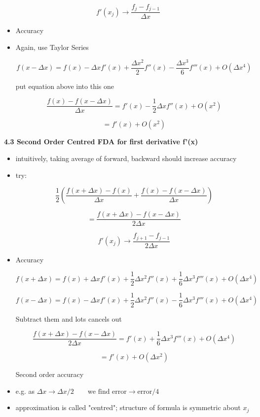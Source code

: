 \begin{equation}
    f'(x_j) \rightarrow \frac{f_j-f_{j-1}}{\Delta x}
\end{equation}

\begin{itemize}
    \item Accuracy
    \item Again, use Taylor Series

    \[ f(x-\Delta x) = f(x) - \Delta x f'(x) + \frac{\Delta x^2}{2} f''(x) - \frac{\Delta x^3}{6} f'''(x) + O(\Delta x^4)\]

    put equation above into this one

    \[ \frac{f(x)-f(x-\Delta x)}{\Delta x} = f'(x) - \frac{1}{2} \Delta x f''(x) + O(x^2)\]

    \[ = f'(x) + O(x^2)\]
\end{itemize}

\textbf{4.3 Second Order Centred FDA for first derivative f'(x)}

\begin{itemize}
    \item intuitively, taking average of forward, backward should increase accuracy
    \item try:

    \[ \frac{1}{2} \left( \frac{f(x+\Delta x)-f(x)}{\Delta x} + \frac{f(x)-f(x-\Delta x)}{\Delta x} \right)\]

    \[ = \frac{f(x+\Delta x) - f(x-\Delta x)}{2 \Delta x}\]
 
    \begin{equation}
        f'(x_j) \rightarrow \frac{f_{j+1} - f_{j-1}}{2\Delta x}
    \end{equation}
    \item Accuracy

    \[ f(x+\Delta x) = f(x) + \Delta x f'(x) + \frac{1}{2} \Delta x^2 f''(x) + \frac{1}{6} \Delta x^3 f'''(x) + O (\Delta x^4) \]

    \[ f(x-\Delta x) = f(x) - \Delta xf'(x) + \frac{1}{2}\Delta x^2f''(x) - \frac{1}{6} \Delta x^3 f'''(x) + O(\Delta x^4)\]

    Subtract them and lots cancels out

    \[ \frac{f(x+ \Delta x)-f(x-\Delta x)}{2\Delta x} = f'(x) + \frac{1}{6} \Delta x^3 f'''(x) + O(\Delta x^4)\]

    \[ = f'(x) + O(\Delta x^2)\]

    Second order accuracy

    \item  e.g. as $\Delta x \rightarrow \Delta x/2 \qquad \text{we find error} \rightarrow \text{error}/4$

    \item approximation is called "centred"; structure of formula is symmetric about $x_j$
\end{itemize}


